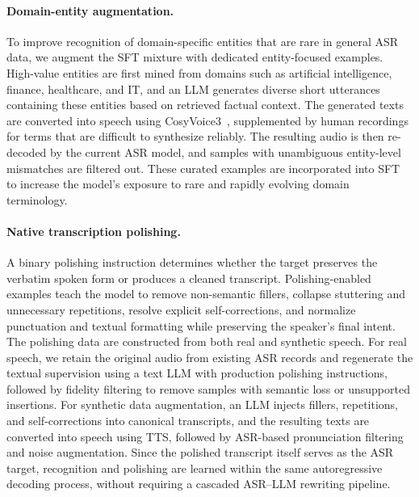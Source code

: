 \documentclass{article}
\begin{document}
%
\paragraph{Domain-entity augmentation.} To improve recognition of domain-specific entities that are rare in general ASR data, we augment the SFT mixture with dedicated entity-focused examples. High-value entities are first mined from domains such as artificial
intelligence, finance, healthcare, and IT, and an LLM generates diverse short utterances containing these entities based on retrieved factual context. The generated texts are converted into speech using CosyVoice3~\citep{DBLP:journals/corr/abs-2505-17589}, supplemented by human recordings for terms that are difficult to synthesize reliably. The resulting audio is then re-decoded by the current ASR model, and samples with unambiguous entity-level mismatches are filtered out. These curated examples are incorporated into SFT to increase the model's exposure to rare and rapidly evolving domain terminology.

\paragraph{Native transcription polishing.}
A binary polishing instruction determines whether the target preserves the verbatim spoken form or produces a cleaned transcript. Polishing-enabled examples teach the model to remove non-semantic fillers, collapse stuttering and unnecessary repetitions, resolve explicit self-corrections, and normalize punctuation and textual formatting while preserving the speaker's final intent. The polishing data are constructed from both real and synthetic speech. For real speech, we retain the original audio from existing ASR records and regenerate the textual supervision using a text LLM with production polishing instructions, followed by fidelity filtering to remove samples with semantic loss or unsupported insertions. For synthetic data augmentation, an LLM injects fillers, repetitions, and self-corrections into canonical transcripts, and the resulting texts are converted into speech using TTS, followed by ASR-based pronunciation filtering and noise augmentation.
Since the polished transcript itself serves as the ASR target, recognition and polishing are learned within the same autoregressive decoding process, without requiring a cascaded ASR--LLM rewriting pipeline.
\end{document}
